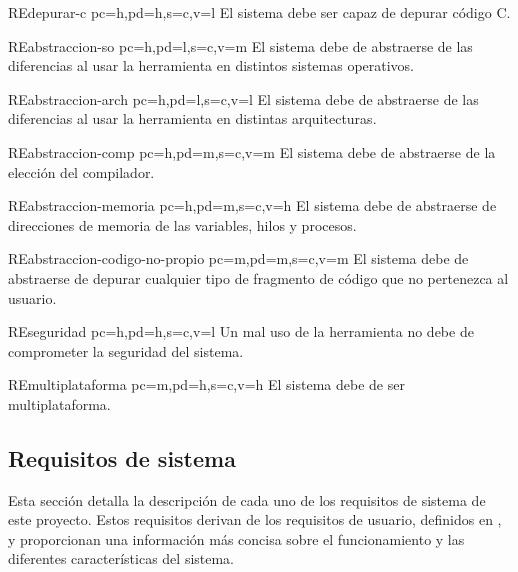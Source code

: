 \begin{userReq}{RE}{depurar-c}
    {pc=h,pd=h,s=c,v=l}
    El sistema debe ser capaz de \gls{depurar} código C.
\end{userReq}

\begin{userReq}{RE}{abstraccion-so}
    {pc=h,pd=l,s=c,v=m}
    El sistema debe de abstraerse de las diferencias al usar la herramienta en distintos sistemas operativos.
\end{userReq}

\begin{userReq}{RE}{abstraccion-arch}
    {pc=h,pd=l,s=c,v=l}
    El sistema debe de abstraerse de las diferencias al usar la herramienta en distintas arquitecturas.
\end{userReq}

\begin{userReq}{RE}{abstraccion-comp}
    {pc=h,pd=m,s=c,v=m}
    El sistema debe de abstraerse de la elección del compilador.
\end{userReq}

\begin{userReq}{RE}{abstraccion-memoria}
    {pc=h,pd=m,s=c,v=h}
    El sistema debe de abstraerse de direcciones de memoria de las variables, \glspl{hilo} y procesos.
\end{userReq}

\begin{userReq}{RE}{abstraccion-codigo-no-propio}
    {pc=m,pd=m,s=c,v=m}
    El sistema debe de abstraerse de depurar cualquier tipo de fragmento de código que no pertenezca al usuario.
\end{userReq}

\begin{userReq}{RE}{seguridad}
    {pc=h,pd=h,s=c,v=l}
    Un mal uso de la herramienta no debe de comprometer la seguridad del sistema.
\end{userReq}

\begin{userReq}{RE}{multiplataforma}
    {pc=m,pd=h,s=c,v=h}
    El sistema debe de ser multiplataforma.
\end{userReq}

\FloatBarrier

\subsection{Requisitos de sistema}\label{subsec:requisitos-sistema}

Esta sección detalla la descripción de cada uno de los requisitos de sistema de este proyecto. Estos requisitos derivan de los requisitos de usuario, definidos en , y proporcionan una información más concisa sobre el funcionamiento y las diferentes características del sistema.


